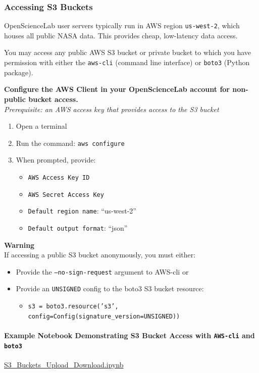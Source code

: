 \subsubsection{Accessing S3 Buckets}

\newline
OpenScienceLab user servers typically run in AWS region \texttt{us-west-2}, which houses all public NASA data. This provides cheap, low-latency data access.

You may access any public AWS S3 bucket or private bucket to which you have permission with either the \texttt{aws-cli} (command line interface) or \texttt{boto3} (Python package).

\begin{framed}
\textbf{Configure the AWS Client in your OpenScienceLab account for non-public bucket access.}\\
\textit{Prerequisite: an AWS access key that provides access to the S3 bucket}

\begin{enumerate}
\item Open a terminal
\item Run the command: \texttt{aws configure}
\item When prompted, provide:\begin{itemize}
\item \texttt{AWS Access Key ID}
\item \texttt{AWS Secret Access Key}
\item \texttt{Default region name}: ``us-west-2''
\item \texttt{Default output format}: ``json''
\end{itemize}
\end{enumerate}
\end{framed}

\begin{framed}
\textbf{Warning}\\
If accessing a public S3 bucket anonymously, you must either:

\begin{itemize}
\item Provide the \texttt{--no-sign-request} argument to AWS-cli
or
\item Provide an \texttt{UNSIGNED} config to the boto3 S3 bucket resource:\begin{itemize}
\item \texttt{s3 = boto3.resource('s3', config=Config(signature\_version=UNSIGNED))}
\end{itemize}
\end{itemize}
\end{framed}

\paragraph{Example Notebook Demonstrating S3 Bucket Access with \texttt{AWS-cli} and \texttt{boto3}}

\href{https://github.com/ASFOpenSARlab/NISAR-Early-Adopters-Workshop-Oct-2024/blob/main/S3\_Buckets\_Upload\_Download.ipynb}{S3\_Buckets\_Upload\_Download.ipynb}

\begin{verbatim}

\end{verbatim}